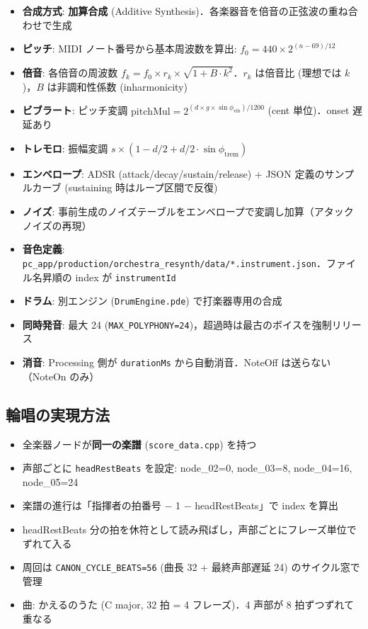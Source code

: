 \documentclass[uplatex,dvipdfmx,a4paper,10pt]{jsarticle}
\begin{document}
\begin{tcolorbox}[cheatbox, title=実装要点]
\begin{itemize}
  \item \textbf{合成方式}: \textbf{加算合成} (Additive Synthesis)．各楽器音を倍音の正弦波の重ね合わせで生成
  \item \textbf{ピッチ}: MIDI ノート番号から基本周波数を算出: $f_0 = 440 \times 2^{(n-69)/12}$
  \item \textbf{倍音}: 各倍音の周波数 $f_k = f_0 \times r_k \times \sqrt{1 + B \cdot k^2}$．$r_k$ は倍音比 (理想では $k$)，$B$ は非調和性係数 (inharmonicity)
  \item \textbf{ビブラート}: ピッチ変調 $\text{pitchMul} = 2^{(d \times g \times \sin\phi_\text{vib}) / 1200}$ (cent 単位)．onset 遅延あり
  \item \textbf{トレモロ}: 振幅変調 $s \times (1 - d/2 + d/2 \cdot \sin\phi_\text{trem})$
  \item \textbf{エンベロープ}: ADSR (attack/decay/sustain/release) + JSON 定義のサンプルカーブ (sustaining 時はループ区間で反復)
  \item \textbf{ノイズ}: 事前生成のノイズテーブルをエンベロープで変調し加算（アタックノイズの再現）
  \item \textbf{音色定義}: \texttt{pc\_app/production/orchestra\_resynth/data/*.instrument.json}．ファイル名昇順の index が \texttt{instrumentId}
  \item \textbf{ドラム}: 別エンジン (\texttt{DrumEngine.pde}) で打楽器専用の合成
  \item \textbf{同時発音}: 最大 24 (\texttt{MAX\_POLYPHONY=24})，超過時は最古のボイスを強制リリース
  \item \textbf{消音}: Processing 側が \texttt{durationMs} から自動消音．NoteOff は送らない（NoteOn のみ）
\end{itemize}
\end{tcolorbox}

\subsection{輪唱の実現方法}

\begin{itemize}
  \item 全楽器ノードが\textbf{同一の楽譜} (\texttt{score\_data.cpp}) を持つ
  \item 声部ごとに \texttt{headRestBeats} を設定: node\_02=0, node\_03=8, node\_04=16, node\_05=24
  \item 楽譜の進行は「指揮者の拍番号 $-$ 1 $-$ headRestBeats」で index を算出
  \item headRestBeats 分の拍を休符として読み飛ばし，声部ごとにフレーズ単位でずれて入る
  \item 周回は \texttt{CANON\_CYCLE\_BEATS=56} (曲長 32 + 最終声部遅延 24) のサイクル窓で管理
  \item 曲: かえるのうた (C major, 32 拍 = 4 フレーズ)．4 声部が 8 拍ずつずれて重なる
\end{itemize}
\end{document}
